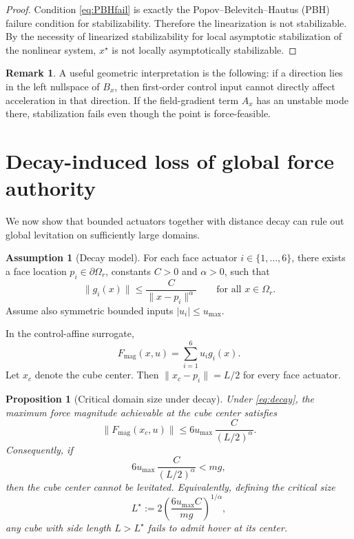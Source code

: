 \documentclass[11pt]{article}
\newtheorem{proposition}{Proposition}
\theoremstyle{definition}
\newtheorem{remark}{Remark}
\newtheorem{assumption}{Assumption}
\begin{document}
\begin{proof}
Condition \eqref{eq:PBHfail} is exactly the Popov--Belevitch--Hautus (PBH) failure condition for stabilizability. Therefore the linearization is not stabilizable. By the necessity of linearized stabilizability for local asymptotic stabilization of the nonlinear system, $x^\star$ is not locally asymptotically stabilizable.
\end{proof}

\begin{remark}
A useful geometric interpretation is the following: if a direction lies in the left nullspace of $B_x$, then first-order control input cannot directly affect acceleration in that direction. If the field-gradient term $A_x$ has an unstable mode there, stabilization fails even though the point is force-feasible.
\end{remark}

\section{Decay-induced loss of global force authority}

We now show that bounded actuators together with distance decay can rule out global levitation on sufficiently large domains.

\begin{assumption}[Decay model]
For each face actuator $i\in\{1,\dots,6\}$, there exists a face location $p_i\in\partial\Omega_r$, constants $C>0$ and $\alpha>0$, such that
\begin{equation}
 \|g_i(x)\| \le \frac{C}{\|x-p_i\|^\alpha}
 \qquad \text{for all } x\in\Omega_r.
 \label{eq:decay}
\end{equation}
Assume also symmetric bounded inputs $|u_i|\le u_{\max}$.
\end{assumption}

In the control-affine surrogate,
\[
F_{\mathrm{mag}}(x,u)=\sum_{i=1}^6 u_i g_i(x).
\]
Let $x_c$ denote the cube center. Then $\|x_c-p_i\|=L/2$ for every face actuator.

\begin{proposition}[Critical domain size under decay]
Under \eqref{eq:decay}, the maximum force magnitude achievable at the cube center satisfies
\begin{equation}
 \|F_{\mathrm{mag}}(x_c,u)\| \le 6u_{\max}\,\frac{C}{(L/2)^\alpha}.
 \label{eq:centerbound}
\end{equation}
Consequently, if
\begin{equation}
 6u_{\max}\,\frac{C}{(L/2)^\alpha} < mg,
 \label{eq:hoverfail}
\end{equation}
then the cube center cannot be levitated. Equivalently, defining the critical size
\begin{equation}
 L^\star := 2\left(\frac{6u_{\max}C}{mg}\right)^{1/\alpha},
 \label{eq:Lstar}
\end{equation}
any cube with side length $L>L^\star$ fails to admit hover at its center.
\end{proposition}
\end{document}
